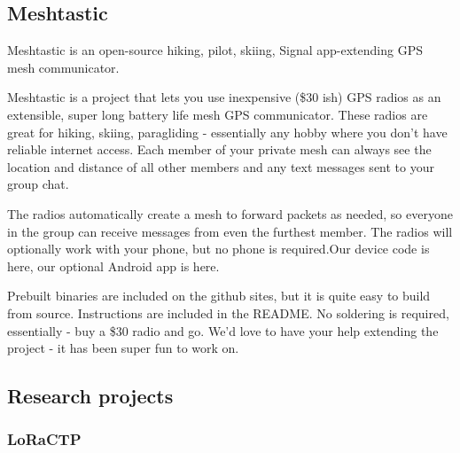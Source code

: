 				
				\subsection{Meshtastic}		
	
						
					Meshtastic is an open-source hiking, pilot, skiing, Signal app-extending GPS mesh communicator.
					
					Meshtastic is a project that lets you use inexpensive (\$30 ish) GPS radios as an extensible, super long battery life mesh GPS communicator. These radios are great for hiking, skiing, paragliding - essentially any hobby where you don’t have reliable internet access. Each member of your private mesh can always see the location and distance of all other members and any text messages sent to your group chat.
					
					The radios automatically create a mesh to forward packets as needed, so everyone in the group can receive messages from even the furthest member. The radios will optionally work with your phone, but no phone is required.Our device code is here, our optional Android app is here.
					
					Prebuilt binaries are included on the github sites, but it is quite easy to build from source. Instructions are included in the README. No soldering is required, essentially - buy a \$30 radio and go. We'd love to have your help extending the project - it has been super fun to work on.
		
		\subsection{Research projects}
		
			
			
			
			\subsubsection{LoRaCTP}
			
			
